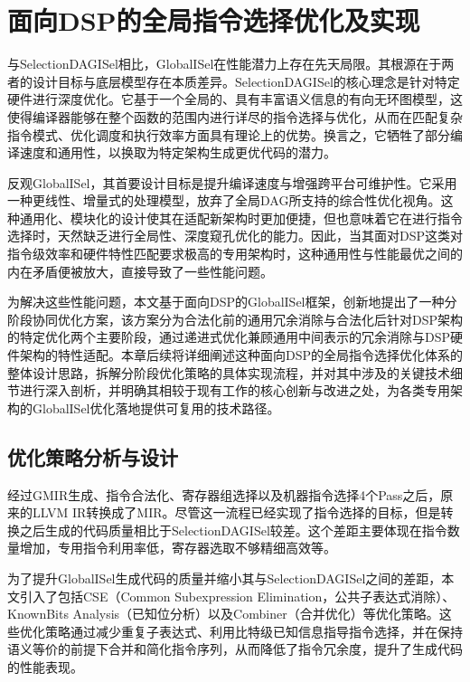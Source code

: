 \chapter{面向DSP的全局指令选择优化及实现}
与SelectionDAGISel相比，GlobalISel在性能潜力上存在先天局限。其根源在于两者的设计目标与底层模型存在本质差异。SelectionDAGISel的核心理念是针对特定硬件进行深度优化。它基于一个全局的、具有丰富语义信息的有向无环图模型，这使得编译器能够在整个函数的范围内进行详尽的指令选择与优化，从而在匹配复杂指令模式、优化调度和执行效率方面具有理论上的优势。换言之，它牺牲了部分编译速度和通用性，以换取为特定架构生成更优代码的潜力。

\par

反观GlobalISel，其首要设计目标是提升编译速度与增强跨平台可维护性。它采用一种更线性、增量式的处理模型，放弃了全局DAG所支持的综合性优化视角。这种通用化、模块化的设计使其在适配新架构时更加便捷，但也意味着它在进行指令选择时，天然缺乏进行全局性、深度窥孔优化的能力。因此，当其面对DSP这类对指令级效率和硬件特性匹配要求极高的专用架构时，这种通用性与性能最优之间的内在矛盾便被放大，直接导致了一些性能问题。

\par

为解决这些性能问题，本文基于面向DSP的GlobalISel框架，创新地提出了一种分阶段协同优化方案，该方案分为合法化前的通用冗余消除与合法化后针对DSP架构的特定优化两个主要阶段，通过递进式优化兼顾通用中间表示的冗余消除与DSP硬件架构的特性适配。本章后续将详细阐述这种面向DSP的全局指令选择优化体系的整体设计思路，拆解分阶段优化策略的具体实现流程，并对其中涉及的关键技术细节进行深入剖析，并明确其相较于现有工作的核心创新与改进之处，为各类专用架构的GlobalISel优化落地提供可复用的技术路径。

\section{优化策略分析与设计}
经过GMIR生成、指令合法化、寄存器组选择以及机器指令选择4个Pass之后，原来的LLVM IR转换成了MIR。尽管这一流程已经实现了指令选择的目标，但是转换之后生成的代码质量相比于SelectionDAGISel较差。这个差距主要体现在指令数量增加，专用指令利用率低，寄存器选取不够精细高效等。

\par

为了提升GlobalISel生成代码的质量并缩小其与SelectionDAGISel之间的差距，本文引入了包括CSE（Common Subexpression Elimination，公共子表达式消除）、KnownBits Analysis（已知位分析）以及Combiner（合并优化）等优化策略。这些优化策略通过减少重复子表达式、利用比特级已知信息指导指令选择，并在保持语义等价的前提下合并和简化指令序列，从而降低了指令冗余度，提升了生成代码的性能表现。


